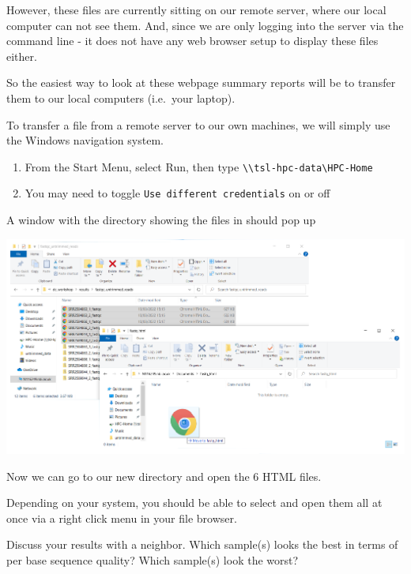 \documentclass[
  letterpaper,
  DIV=11,
  numbers=noendperiod]{scrreprt}
\providecommand{\tightlist}{%
  \setlength{\itemsep}{0pt}\setlength{\parskip}{0pt}}\usepackage{longtable,booktabs,array}
\begin{document}
However, these files are currently sitting on our remote server, where
our local computer can not see them. And, since we are only logging into
the server via the command line - it does not have any web browser setup
to display these files either.

So the easiest way to look at these webpage summary reports will be to
transfer them to our local computers (i.e.~your laptop).

To transfer a file from a remote server to our own machines, we will
simply use the Windows navigation system.

\begin{enumerate}
\def\labelenumi{\arabic{enumi}.}
\tightlist
\item
  From the Start Menu, select Run, then type
  \texttt{\textbackslash{}\textbackslash{}tsl-hpc-data\textbackslash{}HPC-Home}
\item
  You may need to toggle \texttt{Use\ different\ credentials} on or off
\end{enumerate}

A window with the directory showing the files in should pop up

\includegraphics{images/transfer-results-to-local.png}

Now we can go to our new directory and open the 6 HTML files.

Depending on your system, you should be able to select and open them all
at once via a right click menu in your file browser.

\begin{tcolorbox}[enhanced jigsaw, toptitle=1mm, breakable, bottomrule=.15mm, colback=white, toprule=.15mm, opacityback=0, bottomtitle=1mm, coltitle=black, opacitybacktitle=0.6, rightrule=.15mm, colframe=quarto-callout-caution-color-frame, titlerule=0mm, colbacktitle=quarto-callout-caution-color!10!white, title={Exercise}, left=2mm, leftrule=.75mm, arc=.35mm]

Discuss your results with a neighbor. Which sample(s) looks the best in
terms of per base sequence quality? Which sample(s) look the worst?

\end{tcolorbox}
\end{document}
